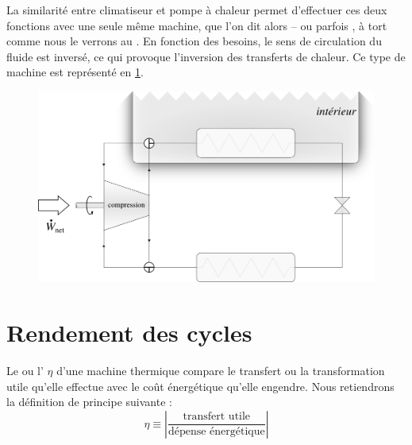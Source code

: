 			\clearfloats
			La similarité entre climatiseur et pompe à chaleur permet d’effectuer ces deux fonctions avec une seule même machine, que l’on dit alors  – ou parfois , à tort comme nous le verrons au \courssept. En fonction des besoins, le sens de circulation du fluide est inversé, ce qui provoque l’inversion des transferts de chaleur. Ce type de machine est représenté en \cref{fig_agencement_thermopompe_climatiseur_inversable}.
			
			\begin{figure}
				\begin{center}
					\includegraphics[width=\textwidth]{images/agencement_thermopompe_climatiseur_inversable.png}
				\end{center}
				\label{fig_agencement_thermopompe_climatiseur_inversable}
			\end{figure}


\section{Rendement des cycles}

	Le  ou l’ $\eta$ d’une machine thermique compare le transfert ou la transformation utile qu’elle effectue avec le coût énergétique qu’elle engendre. Nous retiendrons la définition de principe suivante :
	\begin{equation}
		\eta  \equiv  \left| \frac{\text{transfert utile}}{\text{dépense énergétique}} \right|
		\label{def_efficacité_machines_thermiques}
	\end{equation}

